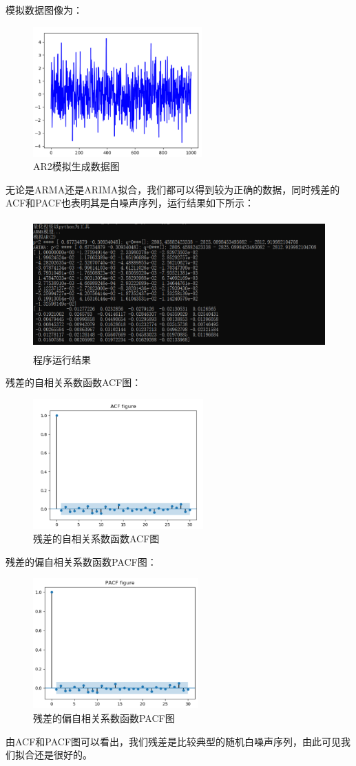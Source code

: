 \documentclass{article}
\begin{document}
模拟数据图像为：
\begin{figure}[H]
	\caption{AR2模拟生成数据图}
	\label{f000013}
	\centering
	\includegraphics[height=5cm]{images/f000013}
\end{figure}
无论是ARMA还是ARIMA拟合，我们都可以得到较为正确的数据，同时残差的ACF和PACF也表明其是白噪声序列，运行结果如下所示：
\begin{figure}[H]
	\caption{程序运行结果}
	\label{f000014}
	\centering
	\includegraphics[height=5cm]{images/f000014}
\end{figure}
残差的自相关系数函数ACF图：
\begin{figure}[H]
	\caption{残差的自相关系数函数ACF图}
	\label{f000015}
	\centering
	\includegraphics[height=5cm]{images/f000015}
\end{figure}
残差的偏自相关系数函数PACF图：
\begin{figure}[H]
	\caption{残差的偏自相关系数函数PACF图}
	\label{f000016}
	\centering
	\includegraphics[height=5cm]{images/f000016}
\end{figure}
由ACF和PACF图可以看出，我们残差是比较典型的随机白噪声序列，由此可见我们拟合还是很好的。
\end{document}
